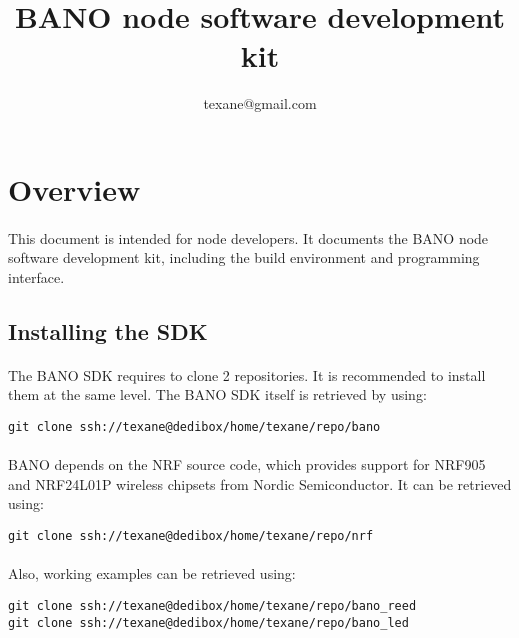 \documentclass[a4paper, 11pt]{article}
\begin{document}
\title{BANO node software development kit}
\author{texane@gmail.com}
\date{}

\maketitle



\clearpage
\section{Overview}

\paragraph{}
This document is intended for node developers. It documents the
BANO node software development kit, including the build
environment and programming interface.

\subsection{Installing the SDK}
\paragraph{}
The BANO SDK requires to clone 2 repositories. It is recommended
to install them at the same level. The BANO SDK itself is
retrieved by using:
\begin{scriptsize}
\begin{verbatim}
git clone ssh://texane@dedibox/home/texane/repo/bano
\end{verbatim}
\end{scriptsize}

\paragraph{}
BANO depends on the NRF source code, which provides support for
NRF905 and NRF24L01P wireless chipsets from Nordic Semiconductor.
It can be retrieved using:
\begin{scriptsize}
\begin{verbatim}
git clone ssh://texane@dedibox/home/texane/repo/nrf
\end{verbatim}
\end{scriptsize}

\paragraph{}
Also, working examples can be retrieved using:
\begin{scriptsize}
\begin{verbatim}
git clone ssh://texane@dedibox/home/texane/repo/bano_reed
git clone ssh://texane@dedibox/home/texane/repo/bano_led
\end{verbatim}
\end{scriptsize}
\end{document}
